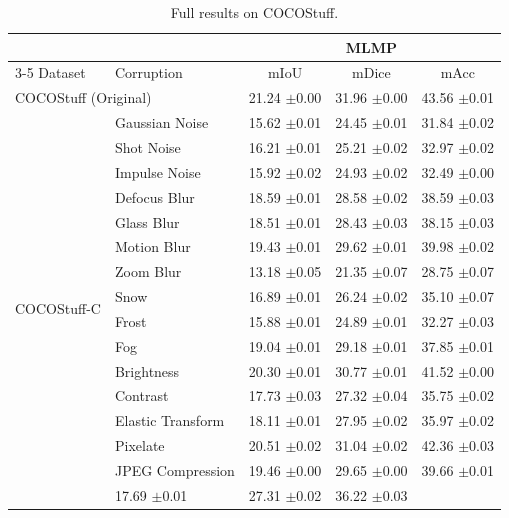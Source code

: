 \documentclass{article}
\begin{document}
\begin{table}[t]
\centering
\caption{Full results on COCOStuff.}
\label{tab:results_cocostuff}
\begin{tabular}{ll|ccc}
\toprule
 & & \multicolumn{3}{c}{MLMP} \\
\cmidrule(lr){3-5}
Dataset & Corruption & mIoU & mDice & mAcc \\
\midrule
\multicolumn{2}{l}{COCOStuff (Original)} & 21.24 {\scriptsize $\pm$0.00} & 31.96 {\scriptsize $\pm$0.00} & 43.56 {\scriptsize $\pm$0.01} \\
\multirow{16}{*}{COCOStuff-C} & Gaussian Noise & 15.62 {\scriptsize $\pm$0.01} & 24.45 {\scriptsize $\pm$0.01} & 31.84 {\scriptsize $\pm$0.02} \\
 & Shot Noise & 16.21 {\scriptsize $\pm$0.01} & 25.21 {\scriptsize $\pm$0.02} & 32.97 {\scriptsize $\pm$0.02} \\
 & Impulse Noise & 15.92 {\scriptsize $\pm$0.02} & 24.93 {\scriptsize $\pm$0.02} & 32.49 {\scriptsize $\pm$0.00} \\
 & Defocus Blur & 18.59 {\scriptsize $\pm$0.01} & 28.58 {\scriptsize $\pm$0.02} & 38.59 {\scriptsize $\pm$0.03} \\
 & Glass Blur & 18.51 {\scriptsize $\pm$0.01} & 28.43 {\scriptsize $\pm$0.03} & 38.15 {\scriptsize $\pm$0.03} \\
 & Motion Blur & 19.43 {\scriptsize $\pm$0.01} & 29.62 {\scriptsize $\pm$0.01} & 39.98 {\scriptsize $\pm$0.02} \\
 & Zoom Blur & 13.18 {\scriptsize $\pm$0.05} & 21.35 {\scriptsize $\pm$0.07} & 28.75 {\scriptsize $\pm$0.07} \\
 & Snow & 16.89 {\scriptsize $\pm$0.01} & 26.24 {\scriptsize $\pm$0.02} & 35.10 {\scriptsize $\pm$0.07} \\
 & Frost & 15.88 {\scriptsize $\pm$0.01} & 24.89 {\scriptsize $\pm$0.01} & 32.27 {\scriptsize $\pm$0.03} \\
 & Fog & 19.04 {\scriptsize $\pm$0.01} & 29.18 {\scriptsize $\pm$0.01} & 37.85 {\scriptsize $\pm$0.01} \\
 & Brightness & 20.30 {\scriptsize $\pm$0.01} & 30.77 {\scriptsize $\pm$0.01} & 41.52 {\scriptsize $\pm$0.00} \\
 & Contrast & 17.73 {\scriptsize $\pm$0.03} & 27.32 {\scriptsize $\pm$0.04} & 35.75 {\scriptsize $\pm$0.02} \\
 & Elastic Transform & 18.11 {\scriptsize $\pm$0.01} & 27.95 {\scriptsize $\pm$0.02} & 35.97 {\scriptsize $\pm$0.02} \\
 & Pixelate & 20.51 {\scriptsize $\pm$0.02} & 31.04 {\scriptsize $\pm$0.02} & 42.36 {\scriptsize $\pm$0.03} \\
 & JPEG Compression & 19.46 {\scriptsize $\pm$0.00} & 29.65 {\scriptsize $\pm$0.00} & 39.66 {\scriptsize $\pm$0.01} \\
\cmidrule(l){2-5}
\multicolumn{2}{l}{\textit{COCOStuff-C Average}} & 17.69 {\scriptsize $\pm$0.01} & 27.31 {\scriptsize $\pm$0.02} & 36.22 {\scriptsize $\pm$0.03} \\
\bottomrule
\end{tabular}
\end{table}
\end{document}
